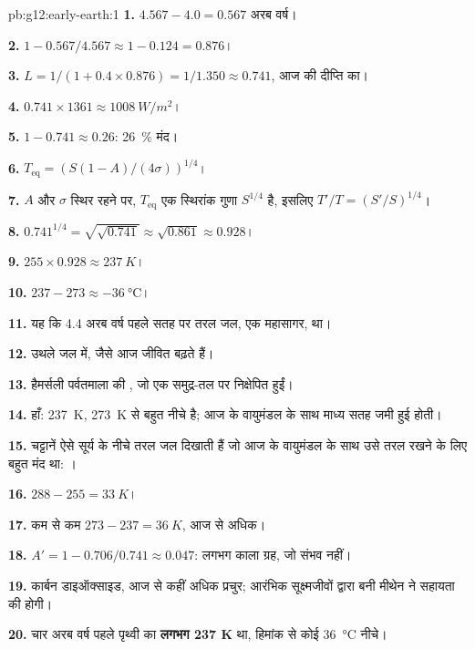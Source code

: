 \begin{solution}{pb:g12:early-earth:1}
\textbf{1.} $4.567 - 4.0 = 0.567$ अरब वर्ष।

\textbf{2.} $1 - 0.567/4.567 \approx 1 - 0.124 = 0.876$।

\textbf{3.} $L = 1/(1 + 0.4 \times 0.876) = 1/1.350 \approx 0.741$, आज की दीप्ति
का।

\textbf{4.} $0.741 \times 1361 \approx \qty{1008}{W/m^2}$।

\textbf{5.} $1 - 0.741 \approx 0.26$: \qty{26}{\percent} मंद।

\textbf{6.} $T_{\mathrm{eq}} = \left(S(1-A)/(4\sigma)\right)^{1/4}$।

\textbf{7.} $A$ और $\sigma$ स्थिर रहने पर, $T_{\mathrm{eq}}$ एक स्थिरांक गुणा
$S^{1/4}$ है, इसलिए $T'/T = (S'/S)^{1/4}$।

\textbf{8.} $0.741^{1/4} = \sqrt{\sqrt{0.741}} \approx \sqrt{0.861} \approx
0.928$।

\textbf{9.} $255 \times 0.928 \approx \qty{237}{K}$।

\textbf{10.} $237 - 273 \approx \qty{-36}{\celsius}$।

\textbf{11.} यह कि 4.4 अरब वर्ष पहले सतह पर तरल जल, एक महासागर,
था।

\textbf{12.} उथले जल में, जैसे आज जीवित  बढ़ते हैं।

\textbf{13.} हैमर्सली पर्वतमाला की , जो एक समुद्र-तल पर
निक्षेपित हुईं।

\textbf{14.} हाँ: \qty{237}{K}, \qty{273}{K} से बहुत नीचे है; आज के
वायुमंडल के साथ माध्य सतह जमी हुई होती।

\textbf{15.} चट्टानें ऐसे सूर्य के नीचे तरल जल दिखाती हैं जो आज के वायुमंडल के साथ उसे तरल
रखने के लिए बहुत मंद था: ।

\textbf{16.} $288 - 255 = \qty{33}{K}$।

\textbf{17.} कम से कम $273 - 237 = \qty{36}{K}$, आज से अधिक।

\textbf{18.} $A' = 1 - 0.706/0.741 \approx 0.047$: लगभग काला ग्रह,
जो संभव नहीं।

\textbf{19.} कार्बन डाइऑक्साइड, आज से कहीं अधिक प्रचुर; आरंभिक सूक्ष्मजीवों द्वारा
बनी मीथेन ने सहायता की होगी।

\textbf{20.} चार अरब वर्ष पहले पृथ्वी का 
\textbf{लगभग 237 K} था, हिमांक से कोई \qty{36}{\celsius} नीचे।
\end{solution}
